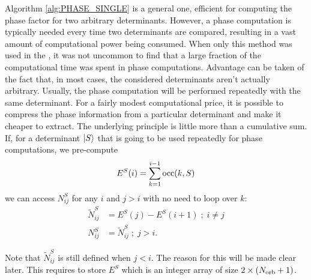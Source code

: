 \documentclass[./thesis.tex]{subfiles}
\begin{document}
Algorithm \ref{alg:PHASE_SINGLE} is a general one, efficient for computing the phase factor for two arbitrary determinants. However, a phase computation is typically needed every time two determinants are compared, resulting in a vast amount of computational power being consumed. When only this method was used in the \QP, it was not uncommon to find that a large fraction of the computational time was spent in phase computations.
Advantage can be taken of the fact that, in most cases, the considered determinants aren't actually arbitrary. Usually, the phase computation will be performed repeatedly with the same determinant. For a fairly modest computational price, it is possible to compress the phase information from a particular determinant and make it cheaper to extract. The underlying principle is little more than a cumulative sum. If, for a determinant $\ket{S}$ that is going to be used repeatedly for phase computations, we pre-compute
\begin{equation}
E^S(i) = \sum_{k=1}^{i-1} {\text{occ}(k,S)}
\end{equation}
we can access $N^S_{ij}$ for any $i$ and $j>i$ with no need to loop over $k$:
\begin{align}
\tilde N^S_{ij} &= E^S(j) - E^S(i+1) \; ; \; i \neq j \\
N^S_{ij} &= \tilde N^S_{ij} \; ; \; j>i.
\end{align}

Note that $\tilde N^S_{ij}$ is still defined when $j<i$. The reason for this will be made clear later.
This requires to store $E^S$ which is an integer array of size $2 \times ({N_\text{orb}}+1)$. 




\end{document}
